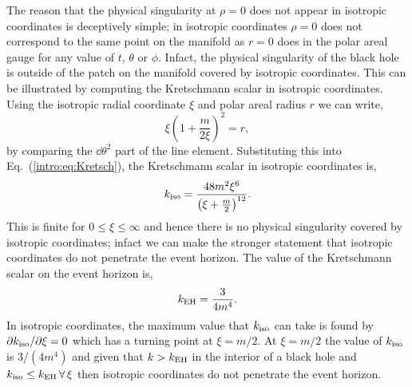 The reason that the physical singularity at $\rho=0$ does not appear in isotropic coordinates is deceptively simple; in isotropic coordinates $\rho=0$ does not correspond to the same point on the manifold as $r=0$ does in the polar areal gauge for any value of $t$, $\theta$ or $\phi$. Infact, the physical singularity of the black hole is outside of the patch on the manifold covered by isotropic coordinates. This can be illustrated by computing the Kretschmann scalar in isotropic coordinates. Using the isotropic radial coordinate $\xi$ and polar areal radius $r$ we can write,
\begin{equation}
\xi \left(1 +\frac{m}{2\xi} \right)^2 = r,
\end{equation}
by comparing the $\dd\theta^2$ part of the line element. Substituting this into Eq.~(\ref{intro:eq:Kretsch}), the Kretschmann scalar in isotropic coordinates is,
\begin{equation}
k_{\rm iso} =  \frac{48 m^2\xi^6}{\left(\xi + \frac{m}{2} \right)^{12}}.
\end{equation}
This is finite for $0\leq \xi \leq \infty$ and hence there is no physical singularity covered by isotropic coordinates; infact we can make the stronger statement that isotropic coordinates do not penetrate the event horizon. The value of the Kretschmann scalar on the event horizon is,
\begin{equation}
k_{\rm EH} = \frac{3}{4 m^4}.
\end{equation}
In isotropic coordinates, the maximum value that $k_{\rm iso}$ can take is found by $\partial k_{\rm iso} / \partial \xi =0 $ which has a turning point at $\xi = m/2$. At $\xi = m/2$ the value of $k_{\rm iso}$ is $3/(4m^4)$ and given that $k>k_{\rm EH}$ in the interior of a black hole and $k_{\rm iso}\leq k_{\rm EH} \,\forall\, \xi$ then isotropic coordinates do not penetrate the event horizon.







